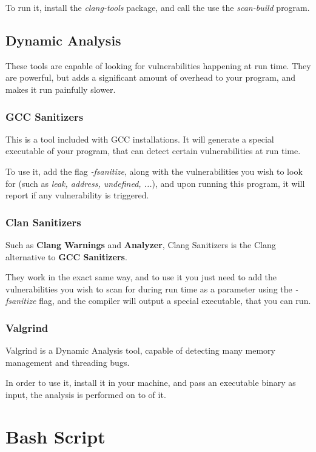 \documentclass{article}
\begin{document}
To run it, install the \textit{clang-tools} package, and call the use the \textit{scan-build} program.

\subsection{Dynamic Analysis}

These tools are capable of looking for vulnerabilities happening at run time. They are powerful, but adds a significant amount of overhead to your program, and makes it run painfully slower.

\subsubsection{GCC Sanitizers}

This is a tool included with GCC installations. It will generate a special executable of your program, that can detect certain vulnerabilities at run time.

To use it, add the flag \textit{-fsanitize}, along with the vulnerabilities you wish to look for (such as \textit{leak, address, undefined, ...}), and upon running this program, it will report if any vulnerability is triggered.

\subsubsection{Clan Sanitizers}

Such as \textbf{Clang Warnings} and \textbf{Analyzer}, Clang Sanitizers is the Clang alternative to \textbf{GCC Sanitizers}.

They work in the exact same way, and to use it you just need to add the vulnerabilities you wish to scan for during run time as a parameter using the \textit{-fsanitize} flag, and the compiler will output a special executable, that you can run.

\subsubsection{Valgrind}

Valgrind is a Dynamic Analysis tool, capable of detecting many memory management and threading bugs.

In order to use it, install it in your machine, and pass an executable binary as input, the analysis is performed on to of it.

\section{Bash Script}
\end{document}
